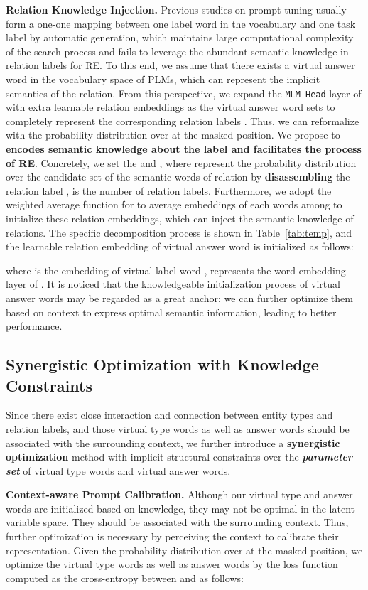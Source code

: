 \documentclass[sigconf]{acmart}
\begin{document}
\textbf{Relation Knowledge Injection.}
Previous studies on prompt-tuning usually form a one-one mapping between one label word in the vocabulary and one task label by automatic generation, which maintains large computational complexity of the search process and fails to leverage the abundant semantic knowledge in relation labels for RE.
To this end, we assume that there exists a  virtual answer word   in the vocabulary space of PLMs, which can represent the implicit semantics of the relation.
From this perspective, we expand the \texttt{MLM Head} layer of   with extra learnable relation embeddings as the virtual answer word sets  to completely represent the corresponding relation labels .
Thus, we can reformalize  with the probability distribution over  at the masked position.
We propose to \textbf{encodes
semantic knowledge about the label and facilitates the process of RE}.
Concretely, we set the  and , where  represent the probability distribution over the candidate set   of the semantic words of relation  by \textbf{disassembling} the relation label ,  is the number of relation labels.
Furthermore, we adopt the weighted average function for  to average embeddings of each words among  to initialize these relation embeddings, which can inject the semantic knowledge of relations.
The specific decomposition process is shown in Table~\ref{tab:temp}, and the learnable relation embedding of virtual answer word  is initialized as follows:

where is the embedding of virtual label word ,
 represents the word-embedding layer of .
It is noticed that the knowledgeable initialization process of virtual answer words may be regarded as a great anchor; we can further optimize them based on context to express optimal semantic information, leading to better performance.




\subsection{Synergistic Optimization with Knowledge Constraints}
\label{sec:opt}
Since there exist close interaction and connection between entity types and relation labels, and those virtual type words as well as answer words should be associated with the surrounding context, we further introduce a \textbf{synergistic optimization} method with implicit structural constraints over the \textbf{\textit{ parameter set}}  of virtual type words and virtual answer words.

\textbf{Context-aware Prompt Calibration.} 
Although our virtual type and answer words are initialized based on knowledge, they may not be optimal in the latent variable space. They should be associated with the surrounding context. 
Thus, further optimization is necessary by perceiving the context to calibrate their representation. 
Given the probability distribution   over  at the masked position, we optimize the virtual type words as well as answer words by the loss function  computed as the cross-entropy between  and   as follows:
\end{document}
